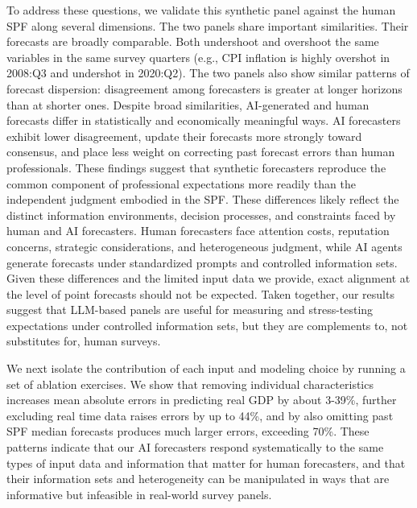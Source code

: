 \documentclass[11pt,letterpaper]{scrartcl}
\begin{document}
To address these questions, we validate this synthetic panel against the human SPF along several dimensions. The two panels share important similarities. Their forecasts are broadly comparable. Both undershoot and overshoot the same variables in the same survey quarters (e.g., CPI inflation is highly overshot in 2008:Q3 and undershot in 2020:Q2).  The two panels also show similar patterns of forecast dispersion: disagreement among forecasters is greater at longer horizons than at shorter ones. Despite broad similarities, AI-generated and human forecasts differ in statistically and economically meaningful ways. AI forecasters exhibit lower disagreement, update their forecasts more strongly toward consensus, and place less weight on correcting past forecast errors than human professionals. These findings suggest that synthetic forecasters reproduce the common component of professional expectations more readily than the independent judgment embodied in the SPF. These differences likely reflect the distinct information environments, decision processes, and constraints faced by human and AI forecasters. Human forecasters face attention costs, reputation concerns, strategic considerations, and heterogeneous judgment, while AI agents generate forecasts under standardized prompts and controlled information sets. 
Given these differences and the limited input data we provide, exact alignment at the level of point forecasts should not be expected. Taken together, our results suggest that LLM-based panels are useful for measuring and stress-testing expectations under controlled information sets, but they are complements to, not substitutes for, human surveys.


We next isolate the contribution of each input and modeling choice by running a set of ablation exercises. We show that removing individual characteristics increases mean absolute errors in predicting real GDP by about 3-39\%, further excluding real time data raises errors by up to 44\%, and by also omitting past SPF median forecasts produces much larger errors, exceeding 70\%. These patterns indicate that our AI forecasters respond systematically to the same types of input data and information that matter for human forecasters, and that their information sets and heterogeneity can be manipulated in ways that are informative but infeasible in real-world survey panels. 
\end{document}
